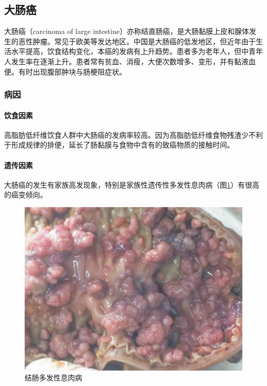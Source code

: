 \subsection{大肠癌}

大肠癌（carcinoma of large
intestine）亦称结直肠癌，是大肠黏膜上皮和腺体发生的恶性肿瘤。常见于欧美等发达地区。中国是大肠癌的低发地区，但近年由于生活水平提高，饮食结构变化，本癌的发病有上升趋势。患者多为老年人，但中青年人发生率在逐渐上升。患者常有贫血、消瘦，大便次数增多、变形，并有黏液血便。有时出现腹部肿块与肠梗阻症状。

\subsubsection{病因}

\paragraph{饮食因素}
高脂肪低纤维饮食人群中大肠癌的发病率较高。因为高脂肪低纤维食物残渣少不利于形成规律的排便，延长了肠黏膜与食物中含有的致癌物质的接触时间。

\paragraph{遗传因素}
大肠癌的发生有家族高发现象，特别是家族性遗传性多发性息肉病（图\ref{fig8-6}）有很高的癌变倾向。

\begin{figure}[!htbp]
 \centering
 \includegraphics{./images/Image00132.jpg}
 \captionsetup{justification=centering}
 \caption{结肠多发性息肉病}
 \label{fig8-6}
  \end{figure} 


